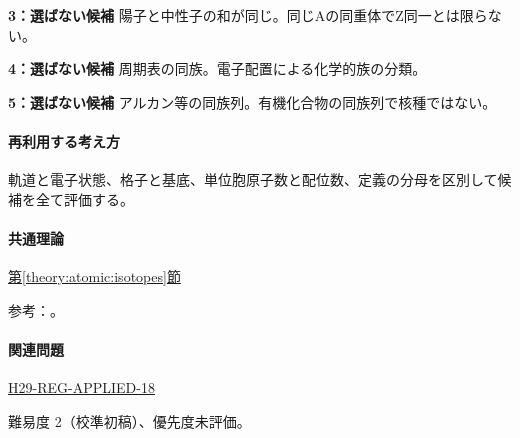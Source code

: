 \noindent\textbf{3：選ばない候補} 陽子と中性子の和が同じ。同じAの同重体でZ同一とは限らない。\par

\noindent\textbf{4：選ばない候補} 周期表の同族。電子配置による化学的族の分類。\par

\noindent\textbf{5：選ばない候補} アルカン等の同族列。有機化合物の同族列で核種ではない。\par

\paragraph{再利用する考え方} 軌道と電子状態、格子と基底、単位胞原子数と配位数、定義の分母を区別して候補を全て評価する。

\paragraph{共通理論} \hyperref[theory:atomic:isotopes]{第\ref*{theory:atomic:isotopes}節}

\par 参考：\cite{modern_mit_nuclear}。

\paragraph{関連問題} \hyperref[q:h29-reg-applied-18]{H29-REG-APPLIED-18}

\par 難易度 2（校準初稿）、優先度未評価。
